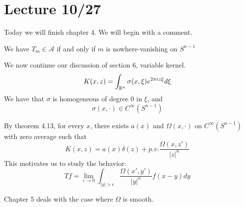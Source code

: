 \section{Lecture 10/27}
Today we will finish chapter 4. We will begin with a comment.
\begin{theorem}
    We have $T_m\in\mathcal{A}$ if and only if $m$ is nowhere-vanishing on $S^{n-1}$
\end{theorem}

We now continue our discussion of section 6, variable kernel.
\begin{equation*}
    K(x,z)=\int_{\mathbb{R}^n}\sigma(x,\xi)e^{2\pi iz\xi}d\xi
\end{equation*}
We have that $\sigma$ is homogeneous of  degree 0 in $\xi$, and 
\begin{equation*}
    \sigma(x,\cdot)\in C^\infty(S^{n-1})
\end{equation*}

By theorem 4.13, for every $x$, there exists $a(x)$ and $\Omega(x, \cdot)$ on $C^\infty(S^{n-1})$ with zero average such that
\begin{equation*}
    K(x,z)=a(x)\delta(z)+p.v.\frac{\Omega(x,z')}{|z|^n}
\end{equation*}
This motivates us to study the behavior:
\begin{equation*}
    Tf=\lim_{\epsilon\to 0}\int_{|y|>\epsilon}\frac{\Omega(x', y')}{|y|^n}f(x-y)dy
\end{equation*}
\begin{remark}
    Chapter 5 deals with the case where $\Omega$ is smooth.
\end{remark}

